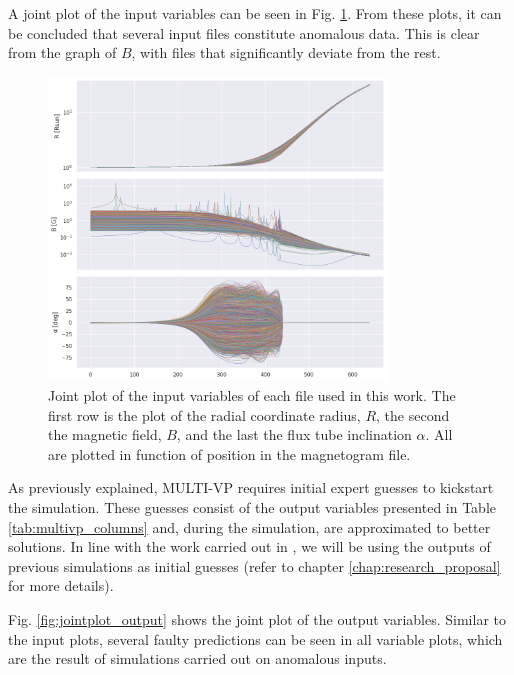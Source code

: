A joint plot of the input variables can be seen in Fig. \ref{fig:jointplot_input}. From these plots, it can be concluded that several input files constitute anomalous data. This is clear from the graph of $B$, with files that significantly deviate from the rest. 


\begin{figure}[h]
    \centering
    \includegraphics[width=0.8\textwidth]{figures/joint_input_cols.png}
    \caption{Joint plot of the input variables of each file used in this work. The first row is the plot of the radial coordinate radius, $R$, the second the magnetic field, $B$, and the last the flux tube inclination $\alpha$. All are plotted in function of position in the magnetogram file.}
    \label{fig:jointplot_input}
\end{figure}

As previously explained, MULTI-VP requires initial expert guesses to kickstart the simulation. These guesses consist of the output variables presented in Table \ref{tab:multivp_columns} and, during the simulation, are approximated to better solutions. In line with the work carried out in \cite{barros_InitialConditionEstimation_}, we will be using the outputs of previous simulations as initial guesses (refer to chapter \ref{chap:research_proposal} for more details).


Fig. \ref{fig:jointplot_output} shows the joint plot of the output variables. Similar to the input plots, several faulty predictions can be seen in all variable plots, which are the result of simulations carried out on anomalous inputs.

